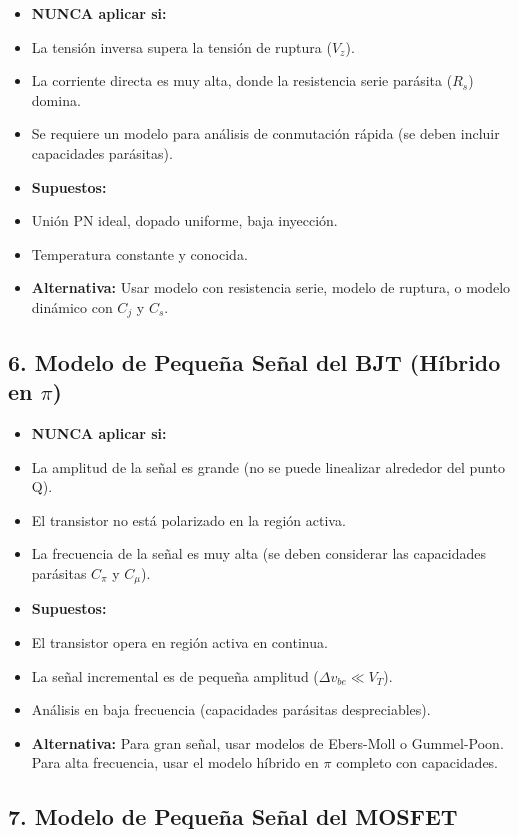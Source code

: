 \documentclass[11pt,a4paper]{article}
\begin{document}
\begin{itemize}[leftmargin=*,topsep=2pt,itemsep=1pt]
  \item \textbf{NUNCA aplicar si:}
  \item La tensión inversa supera la tensión de ruptura ($V_z$).
  \item La corriente directa es muy alta, donde la resistencia serie parásita ($R_s$) domina.
  \item Se requiere un modelo para análisis de conmutación rápida (se deben incluir capacidades parásitas).
  \item \textbf{Supuestos:}
  \item Unión PN ideal, dopado uniforme, baja inyección.
  \item Temperatura constante y conocida.
  \item \textbf{Alternativa:} Usar modelo con resistencia serie, modelo de ruptura, o modelo dinámico con $C_j$ y $C_s$.
\end{itemize}


\subsection*{6. Modelo de Pequeña Señal del BJT (Híbrido en $\pi$)}


\begin{itemize}[leftmargin=*,topsep=2pt,itemsep=1pt]
  \item \textbf{NUNCA aplicar si:}
  \item La amplitud de la señal es grande (no se puede linealizar alrededor del punto Q).
  \item El transistor no está polarizado en la región activa.
  \item La frecuencia de la señal es muy alta (se deben considerar las capacidades parásitas $C_\pi$ y $C_\mu$).
  \item \textbf{Supuestos:}
  \item El transistor opera en región activa en continua.
  \item La señal incremental es de pequeña amplitud ($\Delta v_{be} \ll V_T$).
  \item Análisis en baja frecuencia (capacidades parásitas despreciables).
  \item \textbf{Alternativa:} Para gran señal, usar modelos de Ebers-Moll o Gummel-Poon. Para alta frecuencia, usar el modelo híbrido en $\pi$ completo con capacidades.
\end{itemize}


\subsection*{7. Modelo de Pequeña Señal del MOSFET}
\end{document}
